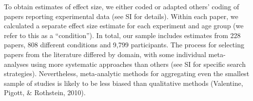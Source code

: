 \documentclass[english,floatsintext,man]{apa6}
\begin{document}
To obtain estimates of effect size, we either coded or adapted others'
coding of papers reporting experimental data (see SI for details).
Within each paper, we calculated a separate effect size estimate for
each experiment and age group (we refer to this as a
\enquote{condition}). In total, our sample includes estimates from 228
papers, 808 different conditions and 9,799 participants. The process for
selecting papers from the literature differed by domain, with some
individual meta-analyses using more systematic approaches than others
(see SI for specific search strategies). Nevertheless, meta-analytic
methods for aggregating even the smallest sample of studies is likely to
be less biased than qualitative methods (Valentine, Pigott, \&
Rothstein, 2010).

\renewcommand{\arraystretch}{1.5}
\end{document}
